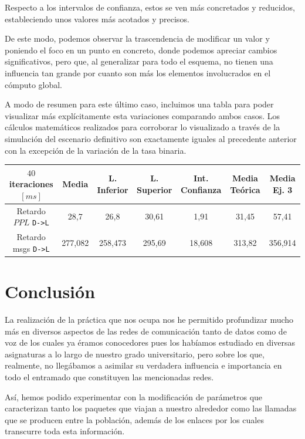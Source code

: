\documentclass{article}[10pt]
\begin{document}
		Respecto a los intervalos de confianza, estos se ven más concretados y reducidos, estableciendo unos valores más acotados y precisos.

		De este modo, podemos observar la trascendencia de modificar un valor y poniendo el foco en un punto en concreto, donde podemos apreciar cambios significativos, pero que, al generalizar para todo el esquema, no tienen una influencia tan grande por cuanto son más los elementos involucrados en el cómputo global.

		A modo de resumen para este último caso, incluimos una tabla para poder visualizar más explícitamente esta variaciones comparando ambos casos. Los cálculos matemáticos realizados para corroborar lo visualizado a través de la simulación del escenario definitivo son exactamente iguales al precedente anterior con la excepción de la variación de la tasa binaria.

		\vskip 3mm

		\begin{center}
			\begin{tabular}{| c | c | c | c | c | c | c |}
						\hline
						$40$ iteraciones $[ms]$ & Media & L. Inferior & L. Superior & Int. Confianza & Media Teórica & Media Ej. 3\\
						\hline
						Retardo $PPL$ \texttt{D->L} & 28,7 & 26,8 & 30,61 & 1,91 & 31,45 & 57,41\\
						\hline
						Retardo msgs \texttt{D->L} & 277,082 & 258,473 & 295,69 & 18,608 & 313,82 & 356,914\\
						\hline
			\end{tabular}
		\end{center}

	\section{Conclusión}
		La realización de la práctica que nos ocupa nos he permitido profundizar mucho más en diversos aspectos de las redes de comunicación tanto de datos como de voz de los cuales ya éramos conocedores pues los habíamos estudiado en diversas asignaturas a lo largo de nuestro grado universitario, pero sobre los que, realmente, no llegábamos a asimilar su verdadera influencia e importancia en todo el entramado que constituyen las mencionadas redes.

		Así, hemos podido experimentar con la modificación de parámetros que caracterizan tanto los paquetes que viajan a nuestro alrededor como las llamadas que se producen entre la población, además de los enlaces por los cuales transcurre toda esta información.
\end{document}
